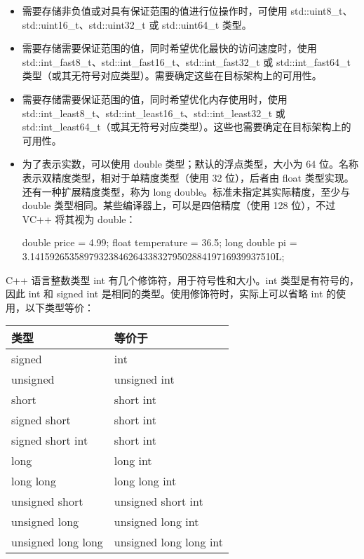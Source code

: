 \begin{itemize}
\item
需要存储非负值或对具有保证范围的值进行位操作时，可使用 std::uint8\_t、std::uint16\_t、std::uint32\_t 或 std::uint64\_t 类型。

\item
需要存储需要保证范围的值，同时希望优化最快的访问速度时，使用 std::int\_fast8\_t、std::int\_fast16\_t、std::int\_fast32\_t 或 std::int\_fast64\_t 类型（或其无符号对应类型）。需要确定这些在目标架构上的可用性。

\item
需要存储需要保证范围的值，同时希望优化内存使用时，使用 std::int\_least8\_t、std::int\_least16\_t、std::int\_least32\_t 或 std::int\_least64\_t（或其无符号对应类型）。这些也需要确定在目标架构上的可用性。

\item
为了表示实数，可以使用 double 类型；默认的浮点类型，大小为 64 位。名称表示双精度类型，相对于单精度类型（使用 32 位），后者由 float 类型实现。还有一种扩展精度类型，称为 long double。标准未指定其实际精度，至少与 double 类型相同。某些编译器上，可以是四倍精度（使用 128 位），不过 VC++ 将其视为 double：

\begin{cpp}
double price = 4.99;
float temperature = 36.5;
long double pi = 3.14159265358979323846264338327950288419716939937510L;
\end{cpp}
\end{itemize}


C++ 语言整数类型 int 有几个修饰符，用于符号性和大小。int 类型是有符号的，因此 int 和 signed int 是相同的类型。使用修饰符时，实际上可以省略 int 的使用，以下类型等价：

\begin{longtable}{|l|l|}
\hline
\textbf{类型}      & \textbf{等价于} \\ \hline
\endfirsthead
%
\endhead
%
signed             & int                    \\ \hline
unsigned           & unsigned int           \\ \hline
short              & short int              \\ \hline
signed short       & short int              \\ \hline
signed short int   & short int              \\ \hline
long               & long int               \\ \hline
long long          & long long int          \\ \hline
unsigned short     & unsigned short int     \\ \hline
unsigned long      & unsigned long int      \\ \hline
unsigned long long & unsigned long long int \\ \hline
\end{longtable}

